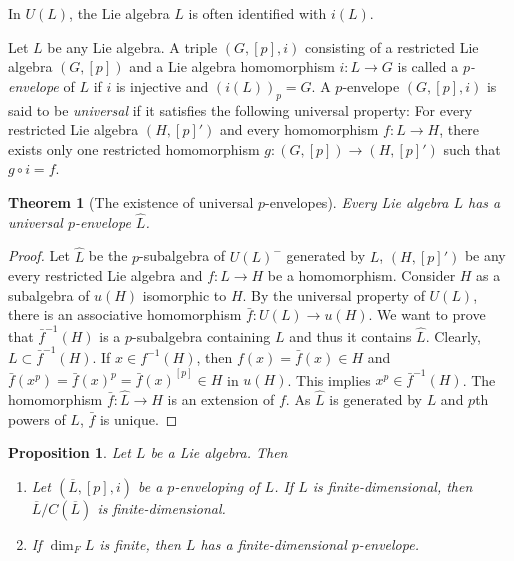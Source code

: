 \documentclass[12pt,MSc]{muthesis_2023}
\theoremstyle{plain}%
\newtheorem{Theorem}[FactCounter]{Theorem} %
\newtheorem{Proposition}[FactCounter]{Proposition} %
\theoremstyle{definition}
\theoremstyle{remark}
\begin{document}
In $U(L)$, the Lie algebra $L$ is often identified with $i(L)$.

Let $L$ be any Lie algebra. A triple $(G, [p], i)$ consisting of a restricted Lie algebra $(G,[p])$ and a Lie algebra homomorphism $i: L\rightarrow G$ is called a \textit{$p$-envelope} of $L$ if $i$ is injective and $(i(L))_p=G$. A $p$-envelope $(G, [p], i)$ is said to be \textit{universal} if it satisfies the following universal property: For every restricted Lie algebra $(H, [p]')$ and every homomorphism $f:L \rightarrow H$, there exists only one restricted homomorphism $g:(G, [p]) \rightarrow (H, [p]')$ such that $g\circ i=f$.

\begin{Theorem}[The existence of universal $p$-envelopes]
Every Lie algebra $L$ has a universal $p$-envelope $\widehat{L}$.
\end{Theorem}

\begin{proof}
Let $\widehat{L}$ be the $p$-subalgebra of $U(L)^-$ generated by $L$,  $(H, [p]')$ be any every restricted Lie algebra and $f:L\rightarrow H$ be a homomorphism. Consider $H$ as a subalgebra of $u(H)$ isomorphic to $H$. By the universal property of $U(L)$, there is an associative homomorphism $\bar{f}: U(L) \rightarrow u(H)$. We want to prove that $\bar{f}^{-1}(H)$ is a $p$-subalgebra containing $L$ and thus it contains $\widehat{L}$. Clearly, $L \subset \bar{f}^{-1}(H)$. If $x\in f^{-1}(H)$, then $f(x)=\bar{f}(x)\in H$ and $\bar{f}(x^p)=\bar{f}(x)^p={\bar{f}(x)}^{[p]}\in H$ in $u(H)$. This implies $x^p\in \bar{f}^{-1}(H)$. The homomorphism $\bar{f}: \widehat{L}\rightarrow H$ is an extension of $f$. As $\widehat{L}$ is generated by $L$ and $p$th powers of $L$, $\bar{f}$ is unique.
\end{proof}

\begin{Proposition}
Let $L$ be a Lie algebra. Then
\begin{enumerate}
\item[(1)]
Let $(\overline{L}, [p], i)$ be a $p$-enveloping of $L$. If $L$ is finite-dimensional, then $\overline{L}/C(\overline{L})$ is finite-dimensional.
\item[(2)]
If $\dim_FL$ is finite, then $L$ has a finite-dimensional $p$-envelope.
\end{enumerate}
\end{Proposition}
\end{document}
